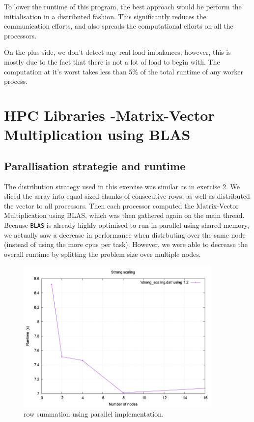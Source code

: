 \documentclass[a4paper,10pt]{article}
\begin{document}
To lower the runtime of this program, the best approach would be perform the initialisation in a distributed fashion.
This significantly reduces the communication efforts, and also spreads the computational efforts on all the processors.

On the plus side, we don't detect any real load imbalances; however, this is mostly due to the fact that there is not a lot of load to begin with.
The computation at it's worst takes less than 5\% of the total runtime of any worker process.

\section{HPC Libraries -Matrix-Vector Multiplication using BLAS}
\subsection{Parallisation strategie and runtime}
The distribution strategy used in this exercise was similar as in exercise 2.
We sliced the array into equal sized chunks of consecutive rows, as well as distributed the vector to all processors.
Then each processor computed the Matrix-Vector Multiplication using BLAS, which was then gathered again on the main thread.
Because \verb|BLAS| is already highly optimised to run in parallel using shared memory, we actually saw a decrease in performance when distrbuting over the same node (instead of using the more cpus per task).
However, we were able to decrease the overall runtime by splitting the problem size over multiple nodes.

\begin{figure}[H]
  \centering
  \includegraphics[width=0.9\textwidth]{img/ex4_strong_scaling}
  \caption{row summation using parallel implementation.}
  \label{fig:ex4_strong_scaling}
\end{figure}
\end{document}
